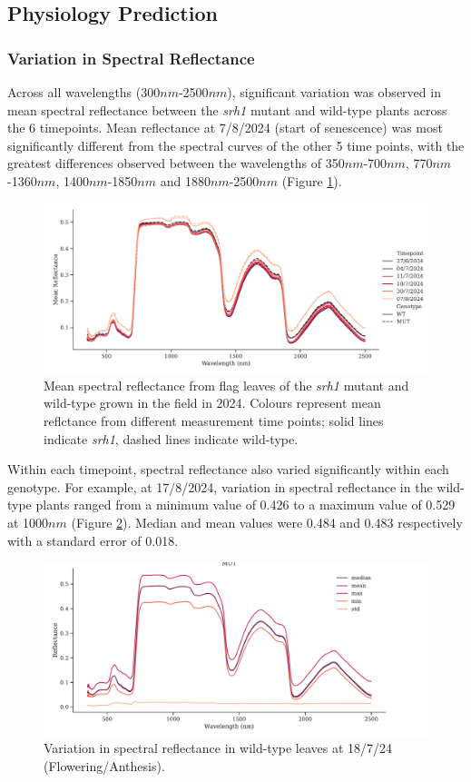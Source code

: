 \documentclass{article}
\begin{document}
\subsection{Physiology Prediction}
\subsubsection{Variation in Spectral Reflectance}
Across all wavelengths (300$nm$-2500$nm$), significant variation was observed in
mean spectral reflectance between the \textit{srh1} mutant and wild-type
plants across the 6 timepoints. Mean reflectance at 7/8/2024 (start of
senescence) was most significantly different from the spectral curves of the
other 5 time points, with the greatest differences observed between the
wavelengths of 350$nm$-700$nm$, 770$nm$-1360$nm$, 1400$nm$-1850$nm$ and 1880$nm$-2500$nm$ (Figure
\ref{mean_spectral_reflctance}).
\begin{figure}[ht]
	\centering
	\includegraphics[width=\textwidth]{Mean Spectra Timepoint.pdf}
	\caption{Mean spectral reflectance from flag leaves of the \textit{srh1}
		mutant and wild-type grown in the field in 2024. Colours represent mean reflctance
		from different measurement time points; solid lines indicate \textit{srh1},
		dashed lines indicate wild-type.}
	\label{mean_spectral_reflctance}
\end{figure}

Within each timepoint, spectral reflectance also varied significantly within
each genotype. For example, at 17/8/2024, variation in spectral reflectance in
the wild-type plants ranged from a minimum value of 0.426 to a maximum value
of 0.529 at 1000$nm$ (Figure \ref{example_mut_trace}). Median and mean values
were 0.484 and 0.483 respectively with a standard error of 0.018.

\begin{figure}[ht]
	\centering
	\includegraphics[width=\textwidth]{Mut Trace.pdf}
	\caption{Variation in spectral reflectance in wild-type leaves at 18/7/24
		(Flowering/Anthesis).}
	\label{example_mut_trace}
\end{figure}
\end{document}
